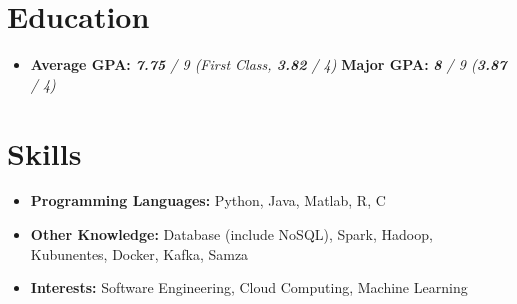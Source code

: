 \documentclass{resume}
\begin{document}



\section{Education}
\begin{itemize}[parsep=0.5ex]
  \item \textbf{Average GPA:} \textit{\textbf{7.75} / 9 (First Class, \textbf{3.82} / 4)} \hspace{0.6cm} \textbf{Major GPA:} \textit{\textbf{8} / 9 (\textbf{3.87} / 4)}
\end{itemize}

\section{Skills}
\begin{itemize}[parsep=0.5ex]
  \item \textbf{Programming Languages:} Python, Java, Matlab, R, C
  \item \textbf{Other Knowledge:} Database (include NoSQL), Spark, Hadoop, Kubunentes, Docker, Kafka, Samza
  \item \textbf{Interests:} Software Engineering, Cloud Computing, Machine Learning
\end{itemize}
\end{document}
